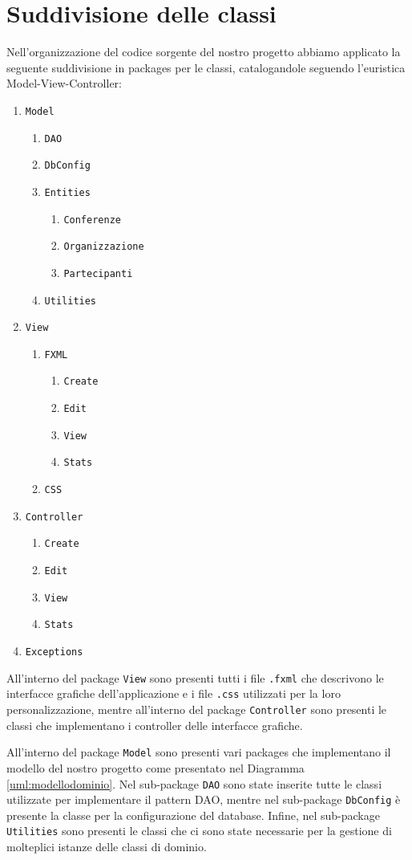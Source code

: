 \section{Suddivisione delle classi}
Nell'organizzazione del codice sorgente del nostro progetto abbiamo applicato la seguente suddivisione in packages per le classi, catalogandole seguendo l'euristica Model-View-Controller:
\begin{enumerate}
\item \texttt{Model}
\begin{enumerate}
\item \texttt{DAO}
\item \texttt{DbConfig}
\item \texttt{Entities}
\begin{enumerate}
\item \texttt{Conferenze}
\item \texttt{Organizzazione}
\item \texttt{Partecipanti}
\end{enumerate}
\item \texttt{Utilities}
\end{enumerate}
\item \texttt{View}
\begin{enumerate}
\item \texttt{FXML}
\begin{enumerate}
\item \texttt{Create}
\item \texttt{Edit}
\item \texttt{View}
\item \texttt{Stats}
\end{enumerate}
\item \texttt{CSS}
\end{enumerate}
\item \texttt{Controller}
\begin{enumerate}
\item \texttt{Create}
\item \texttt{Edit}
\item \texttt{View}
\item \texttt{Stats}
\end{enumerate}
\item \texttt{Exceptions}
\end{enumerate}

All'interno del package \texttt{View} sono presenti tutti i file \texttt{.fxml} che descrivono le interfacce grafiche dell'applicazione e i file \texttt{.css} utilizzati per la loro personalizzazione, mentre all'interno del package \texttt{Controller} sono presenti le classi che implementano i controller delle interfacce grafiche.
\bigskip

All'interno del package \texttt{Model} sono presenti vari packages che implementano il modello del nostro progetto come presentato nel Diagramma \ref{uml:modellodominio}. Nel sub-package \texttt{DAO} sono state inserite tutte le classi utilizzate per implementare il pattern DAO, mentre nel sub-package \texttt{DbConfig} è presente la classe per la configurazione del database. Infine,  nel sub-package \texttt{Utilities} sono presenti le classi che ci sono state necessarie per la gestione di molteplici istanze delle classi di dominio.